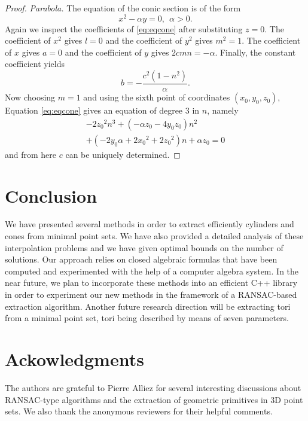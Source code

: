 \documentclass[5p]{elsarticle}
\newcommand{\com}[1]{{\color{black} #1}}
\begin{document}
\begin{proof}
\medskip	
	
\noindent \textit{Parabola.} The equation of the conic section is of the form 
$$x^2-\alpha y=0, \ \ \alpha> 0.$$	
\com{Again} we inspect the coefficients of \eqref{eq:eqcone} after \com{substituting} $z=0$. The coefficient of $x^2$ gives $l=0$ and the coefficient of $y^2$ gives $m^2=1$. The coefficient of $x$ gives $a=0$ and the coefficient of $y$ gives $2cmn=-\alpha$. Finally, the constant coefficient yields 
$$b=-\frac{c^2(1-n^2)}{\alpha}.$$
\com{Now} choosing $m=1$ and using the sixth point of coordinates $(x_0,y_0,z_0)$, \com{Equation}  \eqref{eq:eqcone} gives an equation of degree 3 in $n$, namely
\begin{multline*}
-2{z_0}^{2}{n}^{3}+ \left( -{\alpha} z_0-4 y_0 z_0 \right) {n}^{2} \\ + \left( 
-2 y_0{\alpha}+2{x_0}^{2}+2{z_0}^{2} \right) n+{\alpha}z_0=0	
\end{multline*}	
and from here $c$ can be uniquely determined.
\end{proof}


\section{Conclusion}

\com{We} have presented several methods in order to extract efficiently cylinders and cones from minimal point sets. We have also provided a detailed analysis of these interpolation problems and we have given optimal bounds on the number of solutions. Our approach relies on closed algebraic formulas that have been computed and experimented with the help of a computer algebra system. In \com{the} near future, we plan to \com{incorporate} these methods into an efficient C++ library \com{in order to experiment our new methods in the framework of a RANSAC-based extraction algorithm}. Another future research direction will be \com{extracting} tori from a minimal point set, tori being described by means of seven parameters. 

\section*{Ackowledgments}

The authors are grateful to Pierre Alliez for several interesting discussions about RANSAC-type algorithms and the extraction of geometric primitives in 3D point sets. \com{We also thank the anonymous reviewers for their helpful comments}.
\end{document}
